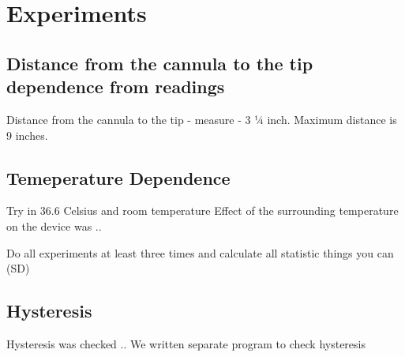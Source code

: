 \section{Experiments}
\label{sec:Experims}

	\subsection{Distance from the cannula to the tip dependence from readings}
	\label{sec:DisExp}
	Distance from the cannula to the tip - measure - 3 ¼ inch. Maximum distance is 9 inches.


	\subsection{Temeperature Dependence}
	\label{sec:TempExp}
	Try in 36.6 Celsius and room temperature
	Effect of the surrounding temperature on the device was ..

	Do all experiments at least three times and calculate all statistic things you can (SD)

	\subsection{Hysteresis}
	\label{sec:HystExp}
	Hysteresis was checked .. 
	We written separate program to check hysteresis